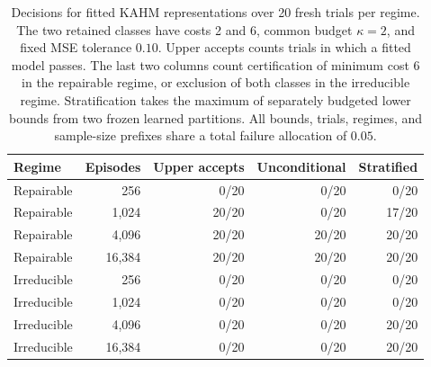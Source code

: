 \begin{table}[t]
\centering
\small
\begin{tabular}{lrrrr}
\toprule
Regime & Episodes & Upper accepts & Unconditional & Stratified \\
\midrule
Repairable & 256 & 0/20 & 0/20 & 0/20 \\
Repairable & 1,024 & 20/20 & 0/20 & 17/20 \\
Repairable & 4,096 & 20/20 & 20/20 & 20/20 \\
Repairable & 16,384 & 20/20 & 20/20 & 20/20 \\
\midrule
Irreducible & 256 & 0/20 & 0/20 & 0/20 \\
Irreducible & 1,024 & 0/20 & 0/20 & 0/20 \\
Irreducible & 4,096 & 0/20 & 0/20 & 20/20 \\
Irreducible & 16,384 & 0/20 & 0/20 & 20/20 \\
\bottomrule
\end{tabular}
\caption{Decisions for fitted KAHM representations over 20 fresh trials per regime. The two retained classes have costs 2 and 6, common budget $\kappa=2$, and fixed MSE tolerance $0.10$. Upper accepts counts trials in which a fitted model passes. The last two columns count certification of minimum cost 6 in the repairable regime, or exclusion of both classes in the irreducible regime. Stratification takes the maximum of separately budgeted lower bounds from two frozen learned partitions. All bounds, trials, regimes, and sample-size prefixes share a total failure allocation of $0.05$.}
\label{tab:learned-kahm-decision}
\end{table}
